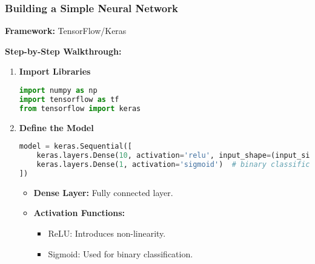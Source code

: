 \documentclass[aspectratio=169]{beamer}
\begin{document}
\begin{frame}[fragile]
  \frametitle{Building a Simple Neural Network}
  \textbf{Framework:} TensorFlow/Keras

  \textbf{Step-by-Step Walkthrough:}

  \begin{enumerate}
    \item \textbf{Import Libraries}
    \begin{lstlisting}[language=Python]
import numpy as np
import tensorflow as tf
from tensorflow import keras
    \end{lstlisting}

    \item \textbf{Define the Model}
    \begin{lstlisting}[language=Python]
model = keras.Sequential([
    keras.layers.Dense(10, activation='relu', input_shape=(input_size,)),
    keras.layers.Dense(1, activation='sigmoid')  # binary classification
])
    \end{lstlisting}
    \begin{itemize}
      \item \textbf{Dense Layer:} Fully connected layer.
      \item \textbf{Activation Functions:}
      \begin{itemize}
        \item ReLU: Introduces non-linearity.
        \item Sigmoid: Used for binary classification.
      \end{itemize}
    \end{itemize}
  \end{enumerate}
\end{frame}
\end{document}
